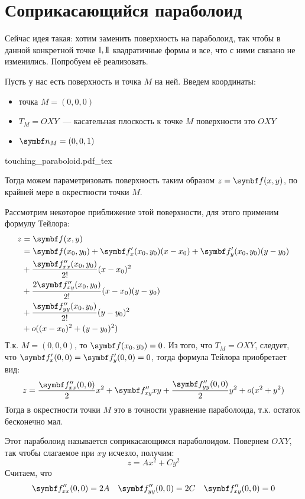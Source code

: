 \documentclass[main]{subfiles}
\begin{document}
\chapter{Соприкасающийся параболоид}
Сейчас идея такая: хотим заменить поверхность на параболоид, так чтобы в данной конкретной точке $\mathrm{I}, \mathrm{I\!I}$ квадратичные формы и все, что с ними связано не изменились.
Попробуем её реализовать.

Пусть у нас есть поверхность и точка $M$ на ней.
Введем координаты:
\begin{itemize}
    \item точка $M = (0,0,0)$
    \item $T_M = OXY$~--- касательная плоскость к точке $M$ поверхности это $OXY$
    \item $\vn_M = (0,0,1)$
\end{itemize}
\begin{center}
    \def\svgwidth{0.5\linewidth}
    {touching_paraboloid.pdf_tex}
\end{center}
Тогда можем параметризовать поверхность таким образом $z = \vf(x,y)$, по крайней мере в окрестности точки $M$.

Рассмотрим некоторое приближение этой поверхности, для этого применим формулу Тейлора:
\begin{align*}
    z & = \vf(x,y)                                                       \\
      & = \vf(x_0,y_0) + \vf'_x(x_0,y_0)(x-x_0) + \vf'_y(x_0,y_0)(y-y_0) \\
      & + \frac{\vf''_{xx}(x_0,y_0)}{2!}(x-x_0)^2                        \\
      & + \frac{2 \vf''_{xy}(x_0,y_0)}{2!}(x- x_0)(y-y_0)                \\
      & + \frac{\vf''_{yy}(x_0,y_0)}{2!}(y-y_0)^2                        \\
      & +o((x-x_0)^2 +(y-y_0)^2)
\end{align*}
Т.к. $M = (0,0,0)$, то $\vf(x_0,y_0) = 0$.
Из того, что $T_M = OXY$, следует, что $\vf'_x(0,0) = \vf'_y(0,0)=0$, тогда формула Тейлора приобретает вид:
\[z = \frac{\vf''_{xx}(0,0)}{2}x^2 + \vf''_{xy}xy + \frac{\vf''_{yy}(0,0)}{2} y^2 + o(x^2 + y^2)\]
Тогда в окрестности точки $M$ это в точности уравнение параболоида, т.к. остаток бесконечно мал.
\begin{definition}
    Этот параболоид называется соприкасающимся параболоидом.
    Повернем $OXY$, так чтобы  слагаемое при $xy$ исчезло, получим:
    \[z = Ax^2 + Cy^2\]
    Считаем, что
    \begin{align*}
        \vf''_{xx}(0,0) & = 2A & \vf''_{yy}(0,0) & =2C & \vf''_{xy}(0,0) = 0
    \end{align*}
\end{definition}
\end{document}
